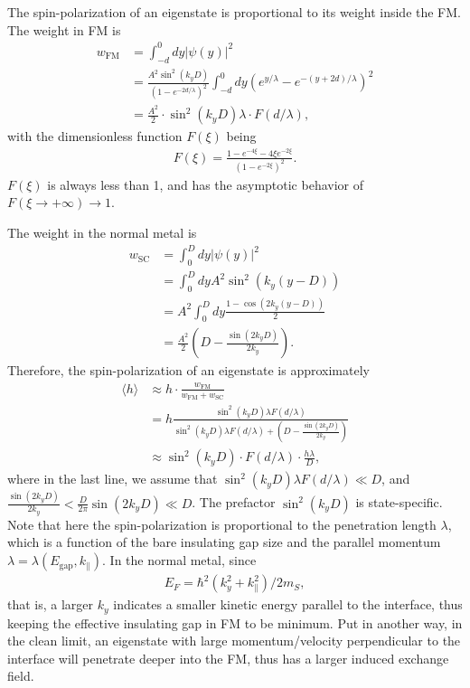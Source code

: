\documentclass{article}
\newcommand{\nn}{\nonumber \\}
\begin{document}
The spin-polarization of an eigenstate is proportional to its weight inside the FM. The weight in FM is
\begin{align}
w_{\text{FM}} &= \int^0_{-d} dy |\psi(y)|^2 \nn
& = \frac{A^2 \sin^2 (k_y D)}{(1 - e^{-2d/\lambda})^2} \int^0_{-d} dy \left( e^{y/\lambda} -  e^{-(y+2d)/\lambda} \right)^2 \nn
&=  \frac{A^2  }{2} \cdot \sin^2 (k_y D) \lambda \cdot F(d/\lambda),
\end{align}
with the dimensionless function $F(\xi)$ being
\begin{align}
F(\xi) =  \frac{ 1 - e^{-4\xi} - 4\xi e^{-2\xi} }{ ( 1 - e^{-2\xi} )^2 }.
\end{align}
$F(\xi)$ is always less than 1, and has the asymptotic behavior of $F(\xi \to + \infty) \to 1$.

 The weight in the normal metal is
\begin{align}
w_{\text{SC}} &= \int^D_{0} dy |\psi(y)|^2 \nn
&= \int^D_{0} dy A^2 \sin^2 (k_y (y-D)) \nn
&=A^2 \int^D_{0} dy \frac{1 - \cos( 2k_y (y-D) )}{2} \nn
&= \frac{A^2}{2} \left( D - \frac{\sin (2k_y D)}{2k_y}  \right).
\end{align}
Therefore, the spin-polarization of an eigenstate is approximately
\begin{align}
\langle h \rangle & \approx h \cdot \frac{w_{\text{FM}}}{ w_{\text{FM}} + w_{\text{SC}}} \nn
&= h \frac{ \sin^2 (k_y D) \lambda F(d/\lambda) }{  \sin^2 (k_y D) \lambda F(d/\lambda) +  \left( D - \frac{\sin (2k_y D)}{2k_y}  \right)} \nn
&\approx  \sin^2 (k_y D) \cdot F(d/\lambda) \cdot \frac{h\lambda }{ D},
\end{align}
where in the last line, we assume that $  \sin^2 (k_y D) \lambda F(d/\lambda)  \ll D$, and $\frac{\sin (2k_y D)}{2k_y} < \frac{D}{2\pi} \sin (2k_y D) \ll D$. The prefactor $\sin^2 (k_y D)$ is state-specific. Note that here the spin-polarization is proportional to the penetration length $\lambda$, which is a function of the bare insulating gap size and the parallel momentum $\lambda = \lambda(E_{\text{gap}}, k_{\parallel})$.
In the normal metal, since 
\begin{align}
E_F = \hbar^2(k^2_y + k^2_{\parallel} )/2m_S,
\end{align}
that is, a larger $k_y$ indicates a smaller kinetic energy parallel to the interface, thus keeping the effective insulating gap in FM to be minimum. Put in another way, in the clean limit, an eigenstate with large momentum/velocity perpendicular to the interface will penetrate deeper into the FM, thus has a larger induced exchange field.
\end{document}
